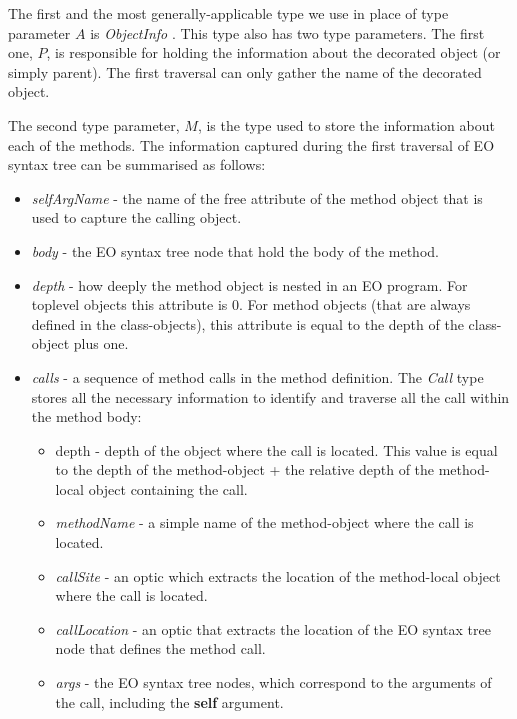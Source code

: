 The first and the most generally-applicable type we use in place of type parameter $A$  is \textit{ObjectInfo} . This type also has two type parameters. The first one, $P$, is responsible for holding the information about the decorated object (or simply parent). The first traversal can only gather the name of the decorated object. 

The second type parameter, $M$, is the type used to store the information about each of the methods. The information captured during the first traversal of EO syntax tree  can be summarised as follows:
\begin{itemize}
    \item \textit{selfArgName} - the name of the free attribute of the method object that is used to capture the calling object. 
    \item \textit{body} - the EO syntax tree node that hold the body of the method. 
    \item \textit{depth} - how deeply the method object is nested in an EO program. For toplevel objects this attribute is $0$. For method objects (that are always defined in the class-objects), this attribute is equal to the depth of the class-object plus one.  
    \item \textit{calls} - a sequence of method calls in the method definition. The \textit{Call} type stores all the necessary information to identify and traverse all the call within the method body:
    \begin{itemize}
        \item depth - depth of the object where the call is located. This value is equal to the depth of the method-object + the relative depth of the method-local object containing the call.
        \item \textit{methodName} - a simple name of the method-object where the call is located.
        \item \textit{callSite} - an optic \cite{optics} which extracts the location of the method-local object where the call is located. 
        \item \textit{callLocation} - an optic \cite{optics} that extracts the location of the EO syntax tree node that defines the method call. 
        \item \textit{args} - the EO syntax tree nodes, which correspond to the arguments of the call, including the \textbf{self} argument.  
    \end{itemize}  
\end{itemize}


